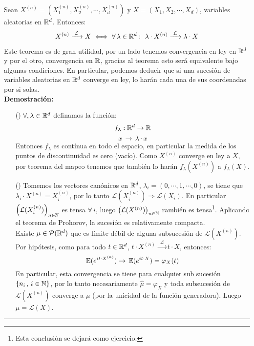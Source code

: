 \begin{teorema} Sean $X^{(n)} = (X_1^{(n)},X_2^{(n)},\cdots,X_d^{(n)})$ y $X=(X_1,X_2,\cdots,X_d)$, variables aleatorias en $\mathbb R^d$. Entonces:
\[X^{(n)}\xrightarrow{\,\,\mathcal{L}\,\,}X\,\,\Longleftrightarrow\,\,\forall\,\lambda\in\mathbb R^d:\,\,\lambda\cdot X^{(n)}\xrightarrow{\,\,\mathcal{L}\,\,}\lambda\cdot X\]
\end{teorema}
Este teorema es de gran utilidad, por un lado tenemos convergencia en ley en $\mathbb R^d$ y por el otro, convergencia en $\mathbb R$, gracias al teorema esto será equivalente bajo algunas condiciones. En particular, podemos deducir que si una sucesión de variables aleatorias en $\mathbb R^d$ converge en ley, lo harán cada una de sus coordenadas por si solas.\\ \newline
\textbf{Demostración: }
\begin{itemize}
    \item[(\Rightarrow)]  $\forall,\lambda\in\mathbb R^d$ definamos la función:
    \[f_{\lambda}: \mathbb R^d\rightarrow\mathbb R\]
    \[x\,\rightarrow\,\lambda\cdot x\]
    Entonces $f_{\lambda}$ es contínua en todo el espacio, en particular la medida de los puntos de discontinuidad es cero (vacío). Como $X^{(n)}$ converge en ley a $X$, por teorema del mapeo tenemos que también lo harán $f_{\lambda}(X^{(n)})$ a $f_{\lambda}(X)$.
    \item[(\Leftarrow)] Tomemos los vectores canónicos en $\mathbb R^d$, $\lambda_i = (0,\cdots,1,\cdots,0)$, se tiene que $\lambda_i \cdot X^{(n)} = X_i^{(n)}$, por lo tanto $\mathcal{L}(X_i^{(n)})\Rightarrow \mathcal{L}(X_i)$. En particular $\left(\mathcal{L}(X_i^{(n)})\right)_{n\in\mathbb N}$ es tensa $\forall\,i$, luego $\left(\mathcal{L}(X^{(n)})\right)_{n\in\mathbb N}$ rambién es tensa\footnote{Esta conclusión se dejará como ejercicio.}. Aplicando el teorema de Prohorov, la sucesión es relativamente compacta. \\ \newline
    Existe $\mu\in\mathcal{P}(\mathbb R^d)$ que es límite débil de alguna subsucesión de $\mathcal{L}(X^{(n)})$. Por hipótesis,  como para todo $t\in\mathbb R^d$, $t\cdot X^{(n)}\,\xrightarrow{\,\,\mathcal{L}\,\,}t\cdot X$, entonces:
    \[\mathbb E(e^{it\cdot X^{(n)}}) \rightarrow\,\mathbb E(e^{it\cdot X}) = \varphi_X(t)\]
    En particular, esta convergencia se tiene para cualquier sub sucesión $\{n_i\,,\,i\in\mathbb N\}$, por lo tanto necesariamente $\hat{\mu}=\varphi_X$ y toda subsucesión de $\mathcal{L}(X^{(n)})$ converge a $\mu$ (por la unicidad de la función generadora). Luego $\mu = \mathcal{L}(X)$. 
\end{itemize}
\rule{0.7em}{0.7em}